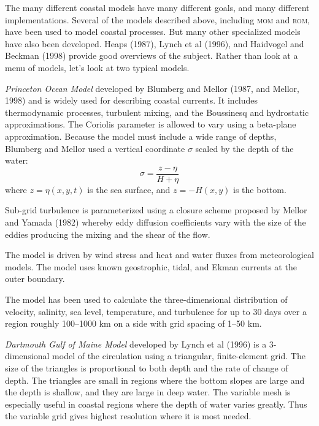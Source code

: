 The many different coastal models have many different goals, and many
different implementations. Several of the models described above,
including \textsc{mom} and \textsc{rom}, have been used to model
coastal processes. But many other specialized models have also been
developed. Heaps (1987), Lynch et al (1996), and Haidvogel and Beckman
(1998) provide good overviews of the subject. Rather than look at a
menu of models, let's look at two typical models.

\textit{Princeton Ocean Model} developed by Blumberg and Mellor (1987,
and Mellor, 1998) and is widely used for describing
coastal currents. It includes thermodynamic processes, turbulent
mixing, and the Boussinesq and
hydrostatic approximations. The
Coriolis parameter is allowed to vary
using a beta-plane approximation. Because the model must include a
wide range of depths, Blumberg and Mellor used a vertical coordinate
$\sigma$ scaled by the depth of the water:
\begin{equation}
\sigma = \frac{z-\eta}{H+\eta}
\end{equation}
where $z=\eta(x, y, t)$ is the sea surface, and $z=-H(x,y)$ is the bottom.

Sub-grid turbulence is parameterized using a
closure scheme proposed by Mellor and Yamada (1982) whereby eddy
diffusion coefficients vary with the size of the eddies producing the
mixing and
the shear of the flow.

The model is driven by wind stress and heat and water fluxes from meteorological models. The
model uses known geostrophic, tidal, and Ekman currents at the outer
boundary.

The model has been used to calculate the three-dimensional
distribution of velocity, salinity, sea level, temperature, and
turbulence for up to 30 days over a
region roughly 100--1000 km on a side with grid spacing of 1--50 km.

\textit{Dartmouth Gulf of Maine Model} developed by Lynch et al (1996)
is a  3-dimensional model of the circulation using a
triangular, finite-element grid. The size of the triangles is
proportional to both depth and the rate of change of depth. The
triangles are small in regions where the bottom slopes are large and
the depth is shallow, and they are large in deep water. The variable
mesh is especially useful in coastal regions where the depth of water
varies greatly. Thus the variable grid gives highest resolution where
it is most needed.

